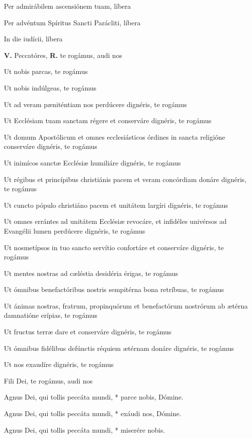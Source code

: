 \documentclass[12pt,a6paper]{book}
\newcommand{\V}{\textbf{V.} }
\newcommand{\R}{\textbf{R.} }
\begin{document}
\begin{sloppy}
Per admirábilem ascensiónem tuam, líbera

Per advéntum Spíritus Sancti Parácliti, líbera

In die iudícii, líbera

\vspace{3mm}

\V Peccatóres, 
\R te rogámus, audi nos

Ut nobis parcas, te rogámus

Ut nobis indúlgeas, te rogámus

Ut ad veram pæniténtiam nos perdúcere dignéris, te rogámus

Ut Ecclésiam tuam sanctam régere et conserváre dignéris, te rogámus

Ut domum Apostólicum et omnes ecclesiásticos órdines in sancta religióne conserváre dignéris, te 
rogámus

Ut inimícos sanctæ Ecclésiæ humiliáre dignéris, te rogámus

Ut régibus et princípibus christiánis pacem et veram concórdiam donáre dignéris, te rogámus

Ut cuncto pópulo christiáno pacem et unitátem largíri dignéris, te rogámus

Ut omnes errántes ad unitátem Ecclésiæ revocáre, et infidéles univérsos ad Evangélii lumen 
perdúcere dignéris, te rogámus

Ut nosmetípsos in tuo sancto servítio confortáre et conserváre dignéris, te rogámus

Ut mentes nostras ad cæléstia desidéria érigas, te rogámus

Ut ómnibus benefactóribus nostris sempitérna bona retríbuas, te rogámus

Ut ánimas nostras, fratrum, propinquórum et benefactórum nostrórum ab ætérna damnatióne erípias, te rogámus

Ut fructus terræ dare et conserváre dignéris, te rogámus

Ut ómnibus fidélibus defúnctis réquiem ætérnam donáre dignéris, te rogámus

Ut nos exaudíre dignéris, te rogámus

Fili Dei, te rogámus, audi nos

\vspace{3mm}

Agnus Dei, qui tollis peccáta mundi, * parce nobis, Dómine.

Agnus Dei, qui tollis peccáta mundi, * exáudi nos, Dómine.

Agnus Dei, qui tollis peccáta mundi, * miserére nobis.


\end{sloppy}
\end{document}
